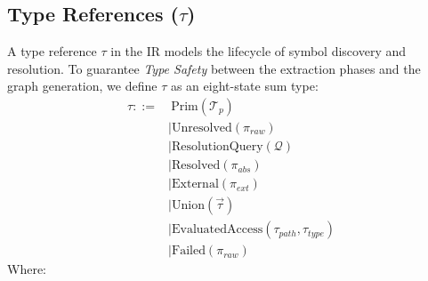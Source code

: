 \subsection{Type References ($\tau$)}
A type reference $\tau$ in the IR models the lifecycle of symbol
discovery and resolution. To guarantee \textit{Type Safety} between
the extraction phases and the graph generation, we define $\tau$ as
an eight-state sum type:
\begin{align*}
  \tau ::=&\ \text{Prim}(\mathcal{T}_{p}) \\
  &\mid \text{Unresolved}(\pi_{raw}) \\
  &\mid \text{ResolutionQuery}(\mathcal{Q}) \\
  &\mid \text{Resolved}(\pi_{abs}) \\
  &\mid \text{External}(\pi_{ext}) \\
  &\mid \text{Union}(\vec{\tau}) \\
  &\mid \text{EvaluatedAccess}(\tau_{path}, \tau_{type}) \\
  &\mid \text{Failed}(\pi_{raw})
\end{align*}
Where:
